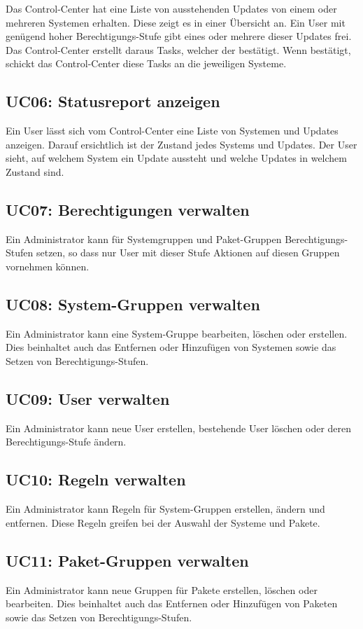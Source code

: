 Das Control-Center hat eine Liste von ausstehenden Updates von einem oder mehreren Systemen erhalten. Diese zeigt es in einer Übersicht an. Ein User mit genügend hoher Berechtigungs-Stufe gibt eines oder mehrere dieser Updates frei. Das Control-Center erstellt daraus Tasks, welcher der bestätigt. Wenn bestätigt, schickt das Control-Center diese Tasks an die jeweiligen Systeme.

\subsection*{UC06: Statusreport anzeigen}
\label{sec:uc_06}

Ein User lässt sich vom Control-Center eine Liste von Systemen und Updates anzeigen. Darauf ersichtlich ist der Zustand jedes Systems und Updates. Der User sieht, auf welchem System ein Update aussteht und welche Updates in welchem Zustand sind.

\subsection*{UC07: Berechtigungen verwalten}
\label{sec:uc_07}

Ein Administrator kann für Systemgruppen und Paket-Gruppen Berechtigungs-Stufen setzen, so dass nur User mit dieser Stufe Aktionen auf diesen Gruppen vornehmen können.

\subsection*{UC08: System-Gruppen verwalten}
\label{sec:uc_08}

Ein Administrator kann eine System-Gruppe bearbeiten, löschen oder erstellen. Dies beinhaltet auch das Entfernen oder Hinzufügen von Systemen sowie das Setzen von Berechtigungs-Stufen.

\subsection*{UC09: User verwalten}
\label{sec:uc_09}

Ein Administrator kann neue User erstellen, bestehende User löschen oder deren Berechtigungs-Stufe ändern.

\subsection*{UC10: Regeln verwalten}
\label{sec:uc_10}

Ein Administrator kann Regeln für System-Gruppen erstellen, ändern und entfernen. Diese Regeln greifen bei der Auswahl der Systeme und Pakete.

\subsection*{UC11: Paket-Gruppen verwalten}
\label{sec:uc_11}

Ein Administrator kann neue Gruppen für Pakete erstellen, löschen oder bearbeiten. Dies beinhaltet auch das Entfernen oder Hinzufügen von Paketen sowie das Setzen von Berechtigungs-Stufen.
